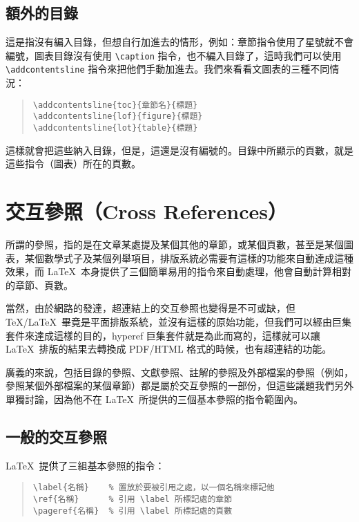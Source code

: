 \subsection{額外的目錄}

這是指沒有編入目錄，但想自行加進去的情形，例如：章節指令使用了星號就不會編號，圖表目錄沒有使用 \verb|\caption| 指令，也不編入目錄了，這時我們可以使用 \verb|\addcontentsline| 指令來把他們手動加進去。我們來看看文圖表的三種不同情況：

\begin{quote}
  \begin{verbatim}
\addcontentsline{toc}{章節名}{標題}
\addcontentsline{lof}{figure}{標題}
\addcontentsline{lot}{table}{標題}
\end{verbatim}
\end{quote}

這樣就會把這些納入目錄，但是，這還是沒有編號的。目錄中所顯示的頁數，就是這些指令（圖表）所在的頁數。

\section{交互參照（Cross References）}
\label{sec:ref}

所謂的參照，指的是在文章某處提及某個其他的章節，或某個頁數，甚至是某個圖表，某個數學式子及某個列舉項目，排版系統必需要有這樣的功能來自動達成這種效果，而 \LaTeX\ 本身提供了三個簡單易用的指令來自動處理，他會自動計算相對的章節、頁數。

當然，由於網路的發達，超連結上的交互參照也變得是不可或缺，但 \TeX/\LaTeX\ 畢竟是平面排版系統，並沒有這樣的原始功能，但我們可以經由巨集套件來達成這樣的目的，{\sffamily hyperef} 巨集套件就是為此而寫的，這樣就可以讓 \LaTeX\ 排版的結果去轉換成 PDF/HTML 格式的時候，也有超連結的功能。

廣義的來說，包括目錄的參照、文獻參照、註解的參照及外部檔案的參照（例如，參照某個外部檔案的某個章節）都是屬於交互參照的一部份，但這些議題我們另外單獨討論，因為他不在 \LaTeX\ 所提供的三個基本參照的指令範圍內。

\subsection{一般的交互參照}

\LaTeX\ 提供了三組基本參照的指令：

\begin{quote}
  \begin{verbatim}
\label{名稱}    % 置放於要被引用之處，以一個名稱來標記他
\ref{名稱}      % 引用 \label 所標記處的章節
\pageref{名稱}  % 引用 \label 所標記處的頁數
\end{verbatim}
\end{quote}


